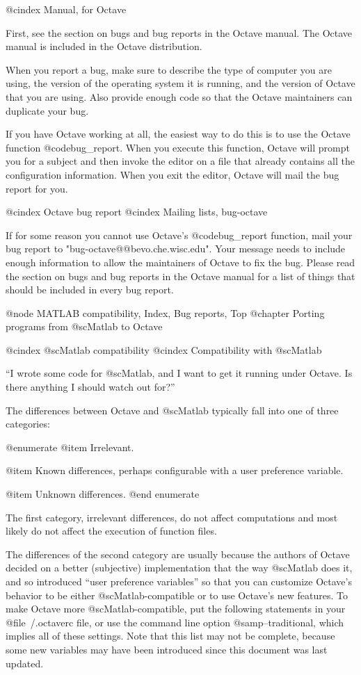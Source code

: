 @cindex Manual, for Octave

First, see the section on bugs and bug reports in the Octave manual.
The Octave manual is included in the Octave distribution.

When you report a bug, make sure to describe the type of computer you
are using, the version of the operating system it is running, and the
version of Octave that you are using.  Also provide enough code so that
the Octave maintainers can duplicate your bug.

If you have Octave working at all, the easiest way to do this is to use
the Octave function @code{bug_report}.  When you execute this function,
Octave will prompt you for a subject and then invoke the editor on a
file that already contains all the configuration information.  When you
exit the editor, Octave will mail the bug report for you.

@cindex Octave bug report
@cindex Mailing lists, bug-octave

If for some reason you cannot use Octave's @code{bug_report} function,
mail your bug report to "bug-octave@@bevo.che.wisc.edu".  Your message
needs to include enough information to allow the maintainers of Octave
to fix the bug.  Please read the section on bugs and bug reports in the
Octave manual for a list of things that should be included in every bug
report.

@node MATLAB compatibility, Index, Bug reports, Top
@chapter Porting programs from @sc{Matlab} to Octave

@cindex @sc{Matlab} compatibility
@cindex Compatibility with @sc{Matlab}

``I wrote some code for @sc{Matlab}, and I want to get it running under
Octave.  Is there anything I should watch out for?''

The differences between Octave and @sc{Matlab} typically fall into one of
three categories:

@enumerate
@item
Irrelevant.

@item
Known differences, perhaps configurable with a user preference variable.

@item
Unknown differences.
@end enumerate

The first category, irrelevant differences, do not affect computations
and most likely do not affect the execution of function files.

The differences of the second category are usually because the authors
of Octave decided on a better (subjective) implementation that the way
@sc{Matlab} does it, and so introduced ``user preference variables'' so that
you can customize Octave's behavior to be either @sc{Matlab}-compatible or
to use Octave's new features.  To make Octave more @sc{Matlab}-compatible,
put the following statements in your @file{~/.octaverc} file, or use the
command line option @samp{--traditional}, which implies all of these
settings.  Note that this list may not be complete, because some new
variables may have been introduced since this document was last updated.

